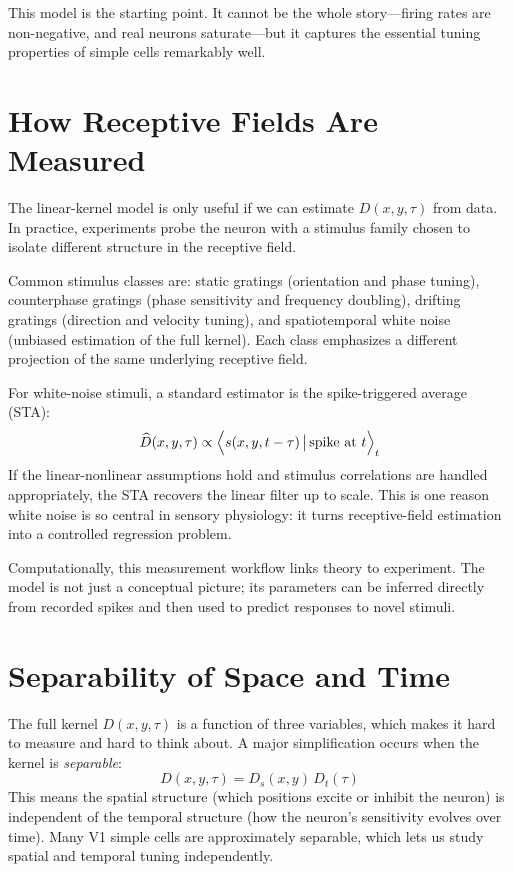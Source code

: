 This model is the starting point. It cannot be the whole story---firing rates are non-negative, and real neurons saturate---but it captures the essential tuning properties of simple cells remarkably well.

\section{How Receptive Fields Are Measured}
\label{sec:rf-measurement}

The linear-kernel model is only useful if we can estimate $D(x,y,\tau)$ from data. In practice, experiments probe the neuron with a stimulus family chosen to isolate different structure in the receptive field.

Common stimulus classes are: static gratings (orientation and phase tuning), counterphase gratings (phase sensitivity and frequency doubling), drifting gratings (direction and velocity tuning), and spatiotemporal white noise (unbiased estimation of the full kernel). Each class emphasizes a different projection of the same underlying receptive field.

For white-noise stimuli, a standard estimator is the spike-triggered average (STA):
%
\begin{equation}
  \widehat{D}(x,y,\tau) \propto
  \Bigl\langle s(x,y,t-\tau)\,\big|\,\text{spike at }t\Bigr\rangle_t
  \label{eq:sta}
\end{equation}
%
If the linear-nonlinear assumptions hold and stimulus correlations are handled appropriately, the STA recovers the linear filter up to scale. This is one reason white noise is so central in sensory physiology: it turns receptive-field estimation into a controlled regression problem.

Computationally, this measurement workflow links theory to experiment. The model is not just a conceptual picture; its parameters can be inferred directly from recorded spikes and then used to predict responses to novel stimuli.

\section{Separability of Space and Time}
\label{sec:separability}

The full kernel $D(x, y, \tau)$ is a function of three variables, which makes it hard to measure and hard to think about. A major simplification occurs when the kernel is \emph{separable}:
%
\begin{equation}
  D(x, y, \tau) = D_s(x, y)\,D_t(\tau)
  \label{eq:separable-rf}
\end{equation}
%
This means the spatial structure (which positions excite or inhibit the neuron) is independent of the temporal structure (how the neuron's sensitivity evolves over time). Many V1 simple cells are approximately separable, which lets us study spatial and temporal tuning independently.

